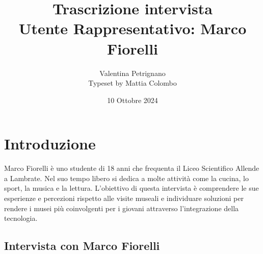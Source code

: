 \documentclass{article}
\title{\textbf{Trascrizione intervista}\\ Utente Rappresentativo: Marco Fiorelli}
\author{Valentina Petrignano \\ Typeset by Mattia Colombo}
\date{10 Ottobre 2024}
\begin{document}
\maketitle

\section{Introduzione}
Marco Fiorelli è uno studente di 18 anni che frequenta il Liceo Scientifico Allende a Lambrate. Nel suo tempo libero si dedica a molte attività come la cucina, lo sport, la musica e la lettura. L’obiettivo di questa intervista è comprendere le sue esperienze e percezioni rispetto alle visite museali e individuare soluzioni per rendere i musei più coinvolgenti per i giovani attraverso l’integrazione della tecnologia.

\subsection{\textcolor{subsectioncolor}{Intervista con Marco Fiorelli}}
\end{document}
